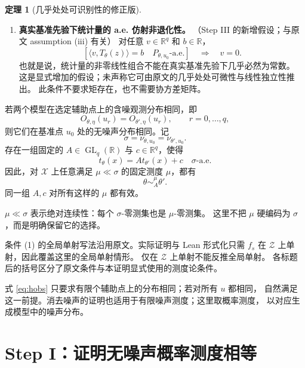 \documentclass[UTF8,fontset=fandol,11pt,a4paper]{ctexart}
\theoremstyle{definition}
\newtheorem{theorem}{定理}
\newcommand{\R}{\mathbb R}
\newcommand{\Zset}{\mathcal Z}
\newcommand{\Xset}{\mathcal X}
\newcommand{\aev}{\text{-a.e.}}
\newcommand{\GL}{\operatorname{GL}}
\newcommand{\ip}[2]{\langle #1,#2\rangle}
\begin{document}
\begin{theorem}[几乎处处可识别性的修正版]
\begin{enumerate}[label=\textnormal{(\arabic*)},leftmargin=*,itemsep=5pt]
\item \textbf{真实基准先验下统计量的 a.e. 仿射非退化性。}
\textnormal{（Step III 的新增假设；与原文 assumption (iii) 有关）}
对任意 $v\in\R^q$ 和 $b\in\R$，
\begin{equation}
 \left[\ip{v}{T_\theta(z)}=b\quad P_{\theta,u_0}\aev\right]
 \quad\Longrightarrow\quad v=0. \label{eq:nd}
\end{equation}
也就是说，统计量的非零线性组合不能在真实基准先验下几乎必然为常数。
这是显式增加的假设；未声称它可由原文的几乎处处可微性与线性独立性推出。
此条件不要求矩存在，也不需要协方差矩阵。
\end{enumerate}
若两个模型在选定辅助点上的含噪观测分布相同，即
\begin{equation}
 O_{\theta,\eta}(u_r)=O_{\theta',\eta}(u_r),
 \qquad r=0,\ldots,q, \label{eq:hobs}
\end{equation}
则它们在基准点 $u_0$ 处的无噪声分布相同。记
\[
 \sigma=\nu_{\theta,u_0}=\nu_{\theta',u_0}.
\]
存在一组固定的 $A\in\GL_q(\R)$ 与 $c\in\R^q$，使得
\begin{equation}
 t_\theta(x)=A t_{\theta'}(x)+c\quad\sigma\aev \label{eq:conclusion}
\end{equation}
因此，对 $\Xset$ 上任意满足 $\mu\ll\sigma$ 的固定测度 $\mu$，都有
\begin{equation}
 \boxed{\theta\sim_A^\mu\theta'.} \label{eq:equivalence}
\end{equation}
同一组 $A,c$ 对所有这样的 $\mu$ 都有效。
\end{theorem}

$\mu\ll\sigma$ 表示绝对连续性：每个 $\sigma$-零测集也是 $\mu$-零测集。
这里不把 $\mu$ 硬编码为 $\sigma$，而是明确保留它的选择。

条件 (1) 的全局单射写法沿用原文。实际证明与 Lean 形式化只需 $f_s$ 在
$\Zset$ 上单射，因此覆盖这里的全局单射情形。
仅在 $\Zset$ 上单射不能反推全局单射。
各标题后的括号区分了原文条件与本证明显式使用的测度论条件。

式 \eqref{eq:hobs} 只要求有限个辅助点上的分布相同；若对所有 $u$ 都相同，
自然满足这一前提。消去噪声的证明也适用于有限噪声测度；这里取概率测度，
以对应生成模型中的噪声分布。

\section{Step I：证明无噪声概率测度相等}
\end{document}
